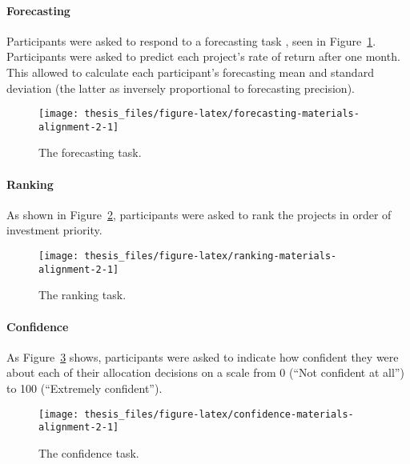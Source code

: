 \documentclass[a4paper, nobind]{templates/ociamthesis}
\theoremstyle{definition}
\theoremstyle{definition}
\theoremstyle{definition}
\theoremstyle{definition}
\theoremstyle{remark}
\begin{document}
\hypertarget{forecasting-materials-alignment-2}{%
\paragraph{Forecasting}\label{forecasting-materials-alignment-2}}

Participants were asked to respond to a forecasting task \autocite[adapted from][]{long2018}, seen in Figure~\ref{fig:forecasting-materials-alignment-2}.
Participants were asked to predict each project's rate of return after one
month. This allowed to calculate each participant's forecasting mean and
standard deviation (the latter as inversely proportional to forecasting
precision).



\begin{figure}
\texttt{[image: thesis\_files/figure-latex/forecasting-materials-alignment-2-1]} \caption{The forecasting task.}\label{fig:forecasting-materials-alignment-2}
\end{figure}

\hypertarget{ranking-materials-alignment-2}{%
\paragraph{Ranking}\label{ranking-materials-alignment-2}}

As shown in Figure~\ref{fig:ranking-materials-alignment-2}, participants were
asked to rank the projects in order of investment priority.



\begin{figure}
\texttt{[image: thesis\_files/figure-latex/ranking-materials-alignment-2-1]} \caption{The ranking task.}\label{fig:ranking-materials-alignment-2}
\end{figure}

\hypertarget{confidence-materials-alignment-2}{%
\paragraph{Confidence}\label{confidence-materials-alignment-2}}

As Figure~\ref{fig:confidence-materials-alignment-2} shows, participants were
asked to indicate how confident they were about each of their allocation
decisions on a scale from 0 (``Not confident at all'') to 100 (``Extremely
confident'').



\begin{figure}
\texttt{[image: thesis\_files/figure-latex/confidence-materials-alignment-2-1]} \caption{The confidence task.}\label{fig:confidence-materials-alignment-2}
\end{figure}
\end{document}
